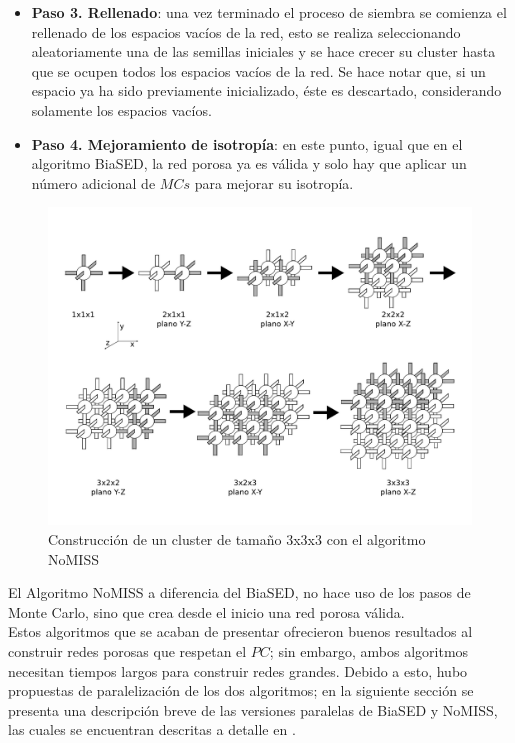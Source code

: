 \begin{itemize}
\item[] \textbf{Paso 3. Rellenado}: una vez terminado el proceso de siembra se comienza el rellenado de los espacios vacíos de la red, esto se realiza 
seleccionando aleatoriamente una de las semillas iniciales y se hace crecer su cluster hasta que se ocupen todos los espacios vacíos de la red.
Se hace notar que, si un espacio ya ha sido previamente inicializado, éste es descartado, considerando solamente los espacios vacíos.

\item[] \textbf{Paso 4. Mejoramiento de isotropía}: en este punto, igual que en el algoritmo BiaSED, la red porosa ya es válida y solo hay que 
aplicar un número adicional de $MCs$ para mejorar su isotropía.
\end{itemize}

\begin{figure}[hbtp]
\centering
\includegraphics[width=5.0in]{img/cluster-nomiss_es.pdf}
\caption{Construcción de un cluster de tamaño 3x3x3 con el algoritmo NoMISS}
\label{fig:cluster_nomiss}
\end{figure}

El Algoritmo NoMISS a diferencia del BiaSED, no hace uso de los pasos de Monte Carlo, sino que crea desde el inicio una red porosa válida.\\
Estos algoritmos que se acaban de presentar ofrecieron buenos resultados al construir redes porosas que respetan el $PC$; sin 
embargo, ambos algoritmos necesitan tiempos largos para construir redes grandes. Debido a esto, hubo propuestas de paralelización de los
dos algoritmos; en la siguiente sección se presenta una descripción breve de las versiones paralelas de BiaSED y NoMISS, las cuales se encuentran 
descritas a detalle en \cite{ref4}.


